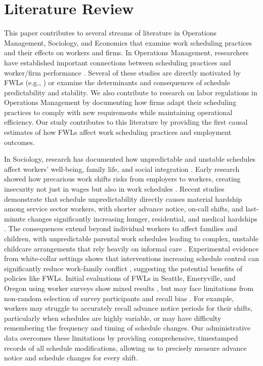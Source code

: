 \documentclass[letterpaper,11pt,leqno]{article}
\theoremstyle{paper}
\begin{document}
\section{Literature Review} \label{sec:literature_review}
This paper contributes to several streams of literature in Operations Management, Sociology, and Economics that examine work scheduling practices and their effects on workers and firms. In Operations Management, researchers have established important connections between scheduling practices and worker/firm performance \citep{fisher_2021, netessine_traffic, kesavan_traffic, call_of_duty_2021, du_scheduling, fisher_raman_2010, kwon2024employee, kwon_hci, retailAIScheduling2025, kwon2025inputinaccuracy, kwon2023inconsistentschedules}. Several of these studies are directly motivated by FWLs (e.g., \cite{du_scheduling}) or examine the determinants and consequences of schedule predictability and stability. We also contribute to research on labor regulations in Operations Management \citep{Asadpour2022MinimumEarnings, KwonWu2021Disclosure, Lu2017DoMandatory, min_wage_yiu} by documenting how firms adapt their scheduling practices to comply with new requirements while maintaining operational efficiency. Our study contributes to this literature by providing the first causal estimates of how FWLs affect work scheduling practices and employment outcomes.

In Sociology, research has documented how unpredictable and unstable schedules affect workers' well-being, family life, and social integration \citep{kalleberg2009precarious,schneider2019consequences}. Early research showed how precarious work shifts risks from employers to workers, creating insecurity not just in wages but also in work schedules \citep{kalleberg2000nonstandard}. Recent studies demonstrate that schedule unpredictability directly causes material hardship among service sector workers, with shorter advance notice, on-call shifts, and last-minute changes significantly increasing hunger, residential, and medical hardships \citep{schneider2021hard}. The consequences extend beyond individual workers to affect families and children, with unpredictable parental work schedules leading to complex, unstable childcare arrangements that rely heavily on informal care \citep{harknett2022who}. Experimental evidence from white-collar settings shows that interventions increasing schedule control can significantly reduce work-family conflict \citep{kelly2011changing}, suggesting the potential benefits of policies like FWLs. Initial evaluations of FWLs in Seattle, Emeryville, and Oregon using worker surveys show mixed results \citep{seattle_pp,ananant_emeryville,fw_unintended,haley_lock}, but may face limitations from non-random selection of survey participants and recall bias \citep{bound2001measurement}. For example, workers may struggle to accurately recall advance notice periods for their shifts, particularly when schedules are highly variable, or may have difficulty remembering the frequency and timing of schedule changes. Our administrative data overcomes these limitations by providing comprehensive, timestamped records of all schedule modifications, allowing us to precisely measure advance notice and schedule changes for every shift.
\end{document}
